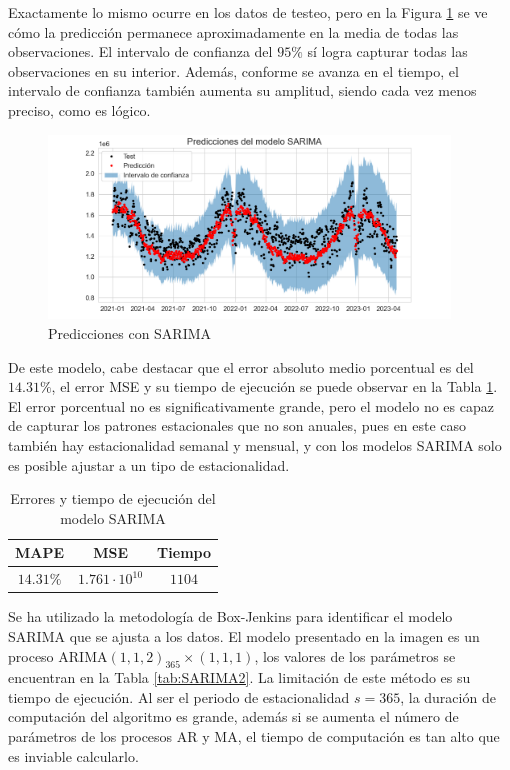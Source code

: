 \documentclass[12pt,twoside]{article}
\newcommand{\arima}{\text{ARIMA}}
\begin{document}
Exactamente lo mismo ocurre en los datos de testeo, pero en la Figura \ref{fig:SARIMA_pred} se ve cómo la predicción permanece aproximadamente en la media de todas las observaciones. El intervalo de confianza del $95\%$ sí logra capturar todas las observaciones en su interior. Además, conforme se avanza en el tiempo, el intervalo de confianza también aumenta su amplitud, siendo cada vez menos preciso, como es lógico. 

\begin{figure}[h]
\centering
    \includegraphics[width = 0.95\textwidth]{imagenes/SARIMA_pred.png}
    \caption{Predicciones con SARIMA}\label{fig:SARIMA_pred}
\end{figure}



De este modelo, cabe destacar que el error absoluto medio porcentual es del $14.31\%$, el error MSE y su tiempo de ejecución se puede observar en la Tabla \ref{tab:SARIMA}. El error porcentual no es significativamente grande, pero el modelo no es capaz de capturar los patrones estacionales que no son anuales, pues en este caso también hay estacionalidad semanal y mensual, y con los modelos SARIMA solo es posible ajustar a un tipo de estacionalidad.

\begin{table}[h]
    \centering
    \begin{tabular}{ccc} \hline
         MAPE & MSE & Tiempo \\ \hline
         $14.31\%$ &  $1.761 \cdot 10^{10}$ & $1104$ \\ \hline
    \end{tabular}
    \caption{Errores y tiempo de ejecución del modelo SARIMA}
    \label{tab:SARIMA}
\end{table}


Se ha utilizado la metodología de Box-Jenkins \cite{TS4} para identificar el modelo SARIMA que se ajusta a los datos. El modelo presentado en la imagen es un proceso $\arima(1,1,2)_{365}\times(1,1,1)$, los valores de los parámetros se encuentran en la Tabla \ref{tab:SARIMA2}. La limitación de este método es su tiempo de ejecución. Al ser el periodo de estacionalidad $s=365$, la duración de computación del algoritmo es grande, además si se aumenta el número de parámetros de los procesos AR y MA, el tiempo de computación es tan alto que es inviable calcularlo.
\end{document}
